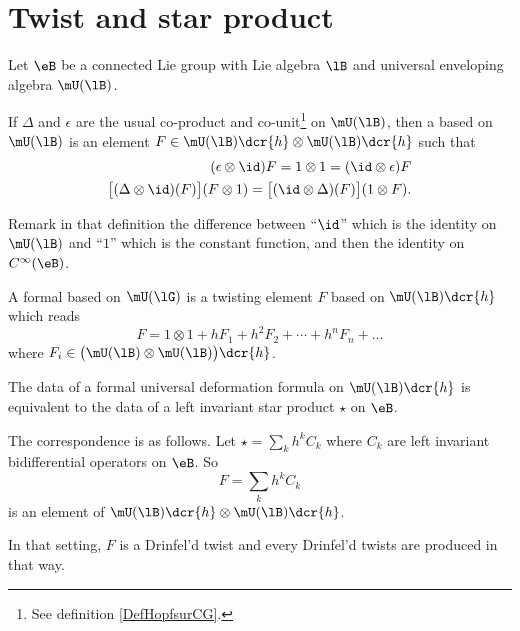 \section{Twist and star product}

Let $\eB$ be a connected Lie group with Lie algebra $\lB$ and universal enveloping algebra $\mU(\lB)$.

\begin{definition}
	If $\Delta$ and $\epsilon$ are the usual co-product and co-unit\footnote{See definition \ref{DefHopfsurCG}.} on $\mU(\lB)$, then a  based on $\mU(\lB)$ is an element $F\in\mU(\lB)\dcr{h}\otimes\mU(\lB)\dcr{h}$ such that
	\begin{subequations}
		\begin{align}
			(\epsilon\otimes\id)F=1\otimes 1=(\id\otimes \epsilon)F					\label{subEqHpfun}	\\
			\big[ (\Delta\otimes\id)(F) \big](F\otimes 1)=\big[ (\id\otimes\Delta)(F) \big](1\otimes F).	\label{subEqHpfcocs}
		\end{align}
	\end{subequations}
\end{definition}
Remark in that definition the difference between ``$\id$'' which is the identity on $\mU(\lB)$ and ``$1$'' which is the constant function, and then the identity on $ C^{\infty}(\eB)$.

\begin{definition}
	A formal  based on $\mU(\lG)$ is a twisting element $F$ based on $\mU(\lB)\dcr{h}$ which reads
	\begin{equation}
		F=1\otimes 1+hF_1+h^2F_2+\cdots+h^nF_n+\ldots
	\end{equation}
	where $F_i\in\big( \mU(\lB)\otimes\mU(\lB) \big)\dcr{h}$.
\end{definition}

\begin{theorem}
	The data of a formal universal deformation formula on $\mU(\lB)\dcr{h}$ is equivalent to the data of a left invariant star product $\star$ on $\eB$.

	The correspondence is as follows. Let $\star=\sum_k h^kC_k$ where $C_k$ are left invariant bidifferential operators on $\eB$. So
	\begin{equation}
		F=\sum_kh^kC_k
	\end{equation}
	is an element of $\mU(\lB)\dcr{h}\otimes \mU(\lB)\dcr{h}$.

	In that setting, $F$ is a Drinfel'd twist and every Drinfel'd twists are produced in that way.
\end{theorem}

